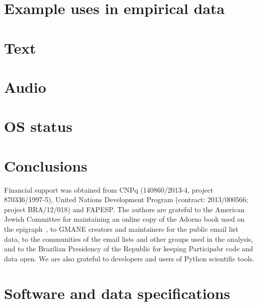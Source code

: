 \documentclass[%
	aip,
	jmp,%
	amsmath,amssymb,
	reprint,%
]{revtex4-1}
\begin{document}
\section{Example uses in empirical data}\label{sec:empirical}


\section{Text}





\section{Audio}


\section{OS status}

\section{Conclusions}\label{sec:conc}
\begin{acknowledgments}
	Financial support was obtained from CNPq (140860/2013-4,
	project 870336/1997-5), United Nations Development Program (contract: 2013/000566; project BRA/12/018) and FAPESP. 
	The authors are grateful to the American Jewish Committee for maintaining an online copy of the Adorno book used on the epigraph~\cite{adorno}, to GMANE creators and maintainers for the public email list data, to the communities of the email lists and other groups used in the analysis, and to the Brazilian Presidency of the Republic for keeping Participabr code and data open.
	We are also grateful to developers and users of Python scientific tools.
\end{acknowledgments}


\appendix
\section{Software and data specifications}\label{ap:soft}


\end{document}
